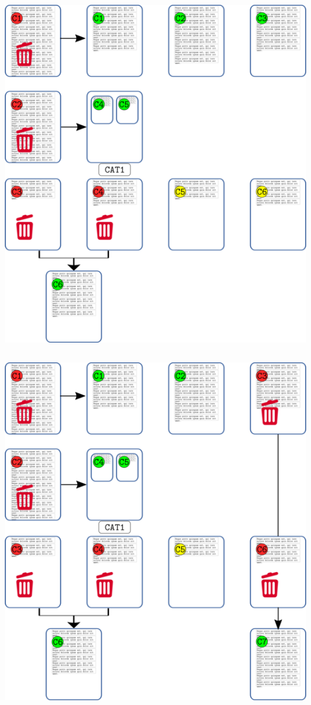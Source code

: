 \includegraphics{imagenes-atlas-8/Categorizacion04.png}

\hypertarget{section-5}{%
\subsection{}\label{section-5}}

\includegraphics{imagenes-atlas-8/Categorizacion05.png}

